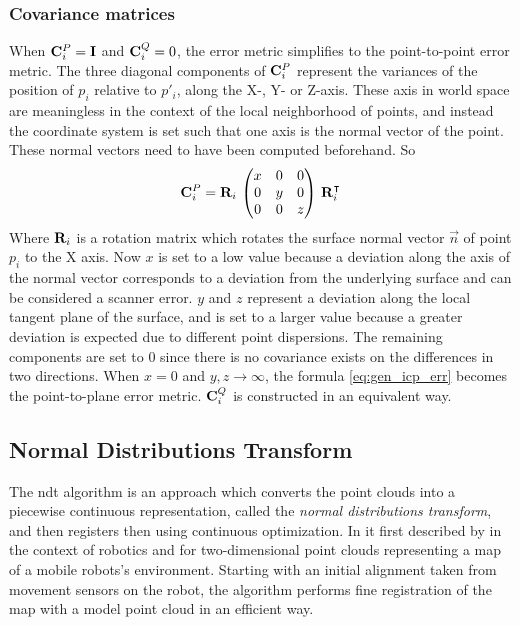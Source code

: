 \subsubsection{Covariance matrices}
When $\mathbf{C}^{P}_i = \mathbf{I}$ and  $\mathbf{C}^{Q}_i = 0$, the error metric simplifies to the point-to-point error metric. The three diagonal components of $\mathbf{C}^{P}_i$ represent the variances of the position of $p_i$ relative to $p'_i$, along the X-, Y- or Z-axis. These axis in world space are meaningless in the context of the local neighborhood of points, and instead the coordinate system is set such that one axis is the normal vector of the point. These normal vectors need to have been computed beforehand. So
\begin{equation}
\mathbf{C}^{P}_i = \mathbf{R}_{i} \, \left( \begin{matrix}
x & 0 & 0 \\
0 & y & 0 \\
0 & 0 & z
\end{matrix} \right) \, \mathbf{R}_{i}^\intercal
\end{equation}
Where $\mathbf{R}_i$ is a rotation matrix which rotates the surface normal vector $\vec{n}$ of point $p_i$ to the X axis. Now $x$ is set to a low value because a deviation along the axis of the normal vector corresponds to a deviation from the underlying surface and can be considered a scanner error. $y$ and $z$ represent a deviation along the local tangent plane of the surface, and is set to a larger value because a greater deviation is expected due to different point dispersions. The remaining components are set to $0$ since there is no covariance exists on the differences in two directions. When $x = 0$ and $y,z \rightarrow \infty$, the formula \ref{eq:gen_icp_err} becomes the point-to-plane error metric. $\mathbf{C}^{Q}_i$ is constructed in an equivalent way.


\subsection{Normal Distributions Transform}
The \gls{ndt} algorithm is an approach which converts the point clouds into a piecewise continuous representation, called the \emph{normal distributions transform}, and then registers then using continuous optimization. In it first described by \cite{Bibe2003} in the context of robotics and for two-dimensional point clouds representing a map of a mobile robots's environment. Starting with an initial alignment taken from movement sensors on the robot, the algorithm performs fine registration of the map with a model point cloud in an efficient way.

